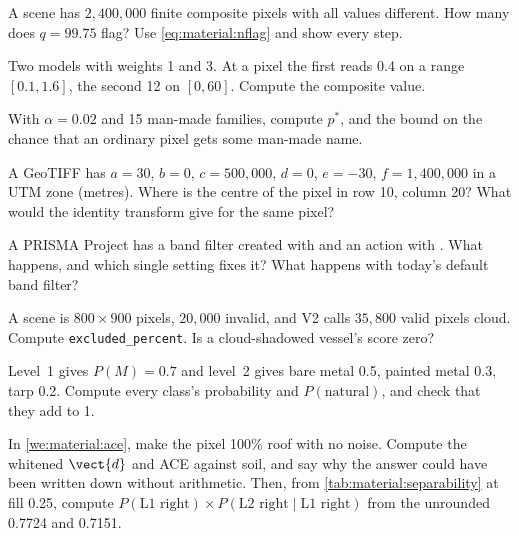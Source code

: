 \begin{checkyourself}
\item\label{ex:material:1} A scene has $2{,}400{,}000$ finite composite pixels with all values different. How
  many does $q=99.75$ flag? Use \cref{eq:material:nflag} and show every step.
\item\label{ex:material:2} Two models with weights 1 and 3. At a pixel the first reads 0.4 on a range
  $[0.1,1.6]$, the second 12 on $[0,60]$. Compute the composite value.
\item\label{ex:material:3} With $\alpha=0.02$ and 15 man-made families, compute $p^*$, and the bound on the
  chance that an ordinary pixel gets some man-made name.
\item\label{ex:material:4} A GeoTIFF has $a=30$, $b=0$, $c=500{,}000$, $d=0$, $e=-30$, $f=1{,}400{,}000$ in a
  UTM zone (metres). Where is the centre of the pixel in row 10, column 20? What would the identity transform
  give for the same pixel?
\item\label{ex:material:5} A PRISMA Project has a band filter created with 
  and an  action with . What happens, and
  which single setting fixes it? What happens with today's default band filter?
\item\label{ex:material:6} A scene is $800\times900$ pixels, $20{,}000$ invalid, and V2 calls $35{,}800$ valid
  pixels cloud. Compute \texttt{excluded\_percent}. Is a cloud-shadowed vessel's score zero?
\item\label{ex:material:7} Level~1 gives $P(M)=0.7$ and level~2 gives bare metal 0.5, painted metal 0.3, tarp 0.2.
  Compute every class's probability and $P(\text{natural})$, and check that they add to 1.
\item\label{ex:material:8} In \cref{we:material:ace}, make the pixel 100\% roof with no noise. Compute the whitened
  $\vect{d}$ and ACE against soil, and say why the answer could have been written down without arithmetic. Then, from
  \cref{tab:material:separability} at fill 0.25, compute $P(\text{L1 right})\times P(\text{L2 right}\mid\text{L1
  right})$ from the unrounded 0.7724 and 0.7151.
\end{checkyourself}

